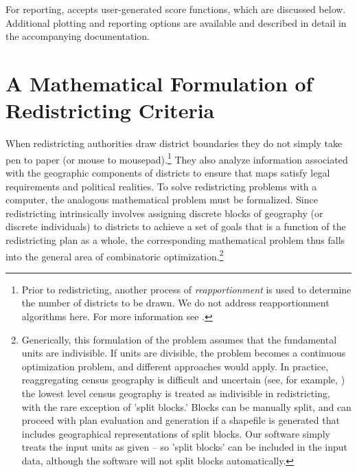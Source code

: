 \documentclass[article]{JSSstyle/jss}
\begin{document}
For reporting,  accepts user-generated score functions, which are discussed below. Additional plotting and reporting options are available and described in detail in the accompanying documentation.  

\section{A Mathematical Formulation of Redistricting Criteria}

When redistricting authorities draw district boundaries they do not 
simply take pen to paper (or mouse to mousepad).\footnote{Prior to redistricting, another process of \emph{reapportionment} is used to determine the number of districts to be drawn. We do not address reapportionment algorithms here. For more information see \citet{BalYoung01}.}  They also analyze information associated with the geographic 
components of districts to ensure that maps satisfy legal requirements and political realities. 
To solve redistricting problems with a computer, the analogous mathematical problem must be formalized.  Since redistricting 
intrinsically involves assigning discrete blocks of geography (or 
discrete individuals) to districts to achieve a set of goals that is a function 
of the redistricting plan as a whole, the corresponding mathematical 
problem thus falls into the general area of combinatoric optimization.\footnote{Generically, this formulation of the problem assumes that the fundamental units are indivisible. If units are divisible, the problem becomes a continuous optimization problem, and different approaches would apply. In practice, reaggregating census geography is difficult and uncertain (see, for example, \citet{ROAD}) the lowest level census geography is treated as indivisible in redistricting, with the rare exception of 'split blocks.' Blocks can be manually split, and  can proceed with plan evaluation and generation if a shapefile is generated that includes geographical representations of split blocks. Our software simply treats the input units as given -- so 'split blocks' can be included in the input data, although the software will not split blocks automatically.}
\end{document}
